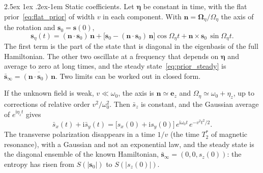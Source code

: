 \documentclass[10pt,a4paper]{article}
\makeatletter
\renewcommand{\paragraph}{\@startsection{paragraph}{4}{\z@}%
  {2.5ex \@plus 1ex \@minus .2ex}{-1em}%
  {\normalfont\fontsize{14pt}{17pt}\selectfont\bfseries}}
\newcommand{\ii}{\mathrm{i}}
\makeatother
\begin{document}
\paragraph{Static coefficients.}
Let $ \boldsymbol{\eta} $ be constant in time, with the flat prior~\eqref{eq:flat_prior} of width $ v $ in each component.
With $ \mathbf{n} = \boldsymbol{\Omega}_\eta/\Omega_\eta $ the axis of the rotation and $ \mathbf{s}_0 = \mathbf{s}(0) $,
\[
  \mathbf{s}_\eta(t) = (\mathbf{n}\cdot\mathbf{s}_0)\,\mathbf{n}
  + \big[\mathbf{s}_0 - (\mathbf{n}\cdot\mathbf{s}_0)\,\mathbf{n}\big]\cos\Omega_\eta t
  + \mathbf{n}\times\mathbf{s}_0\,\sin\Omega_\eta t .
\]
The first term is the part of the state that is diagonal in the eigenbasis of the full Hamiltonian.
The other two oscillate at a frequency that depends on $ \boldsymbol{\eta} $ and average to zero at long times, and the steady state~\eqref{eq:prior_steady} is $ \bar{\mathbf{s}}_\infty = \overline{(\mathbf{n}\cdot\mathbf{s}_0)\,\mathbf{n}} $.
Two limits can be worked out in closed form.

If the unknown field is weak, $ v \ll \omega_0 $, the axis is $ \mathbf{n} \simeq \mathbf{e}_z $ and $ \Omega_\eta \simeq \omega_0 + \eta_z $, up to corrections of relative order $ v^{2}/\omega_0^{2} $.
Then $ \bar s_z $ is constant, and the Gaussian average of $ e^{\ii \eta_zt} $ gives
\[
  \bar s_x(t) + \ii\bar s_y(t) = \big[s_x(0) + \ii s_y(0)\big]\,e^{\ii \omega_0t}\,e^{-v^{2}t^{2}/2} .
\]
The transverse polarization disappears in a time $ 1/v $ (the time $ T_2^{*} $ of magnetic resonance), with a Gaussian and not an exponential law, and the steady state is the diagonal ensemble of the known Hamiltonian, $ \bar{\mathbf{s}}_\infty = (0, 0, s_z(0)) $: the entropy has risen from $ S(|\mathbf{s}_0|) $ to $ S(|s_z(0)|) $.
\end{document}
